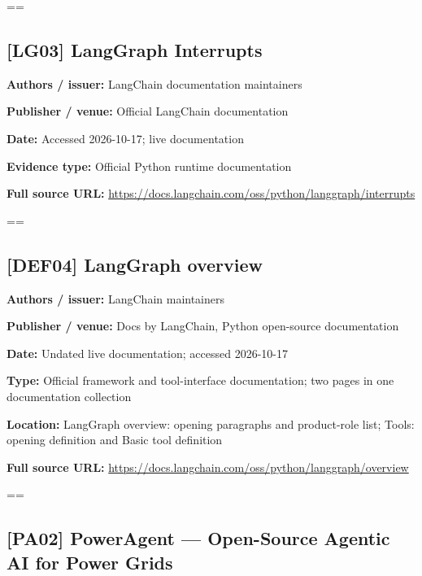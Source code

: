\documentclass[10pt,letterpaper]{article}
\begin{document}
\egroup\par\noindent\box\readingEntry\par\medskip
\setbox\readingEntry=\vbox\bgroup\hsize=\linewidth\subsection*{[LG03] LangGraph Interrupts}
\textbf{Authors / issuer:} LangChain documentation maintainers\par
\textbf{Publisher / venue:} Official LangChain documentation\par
\textbf{Date:} Accessed 2026-10-17; live documentation\par
\textbf{Evidence type:} Official Python runtime documentation\par
\textbf{Full source URL:} \href{https://docs.langchain.com/oss/python/langgraph/interrupts}{\small\ttfamily https:/\allowbreak{}/\allowbreak{}docs.\allowbreak{}langchain.\allowbreak{}com/\allowbreak{}oss/\allowbreak{}python/\allowbreak{}langgraph/\allowbreak{}interrupts}\par
\egroup\par\noindent\box\readingEntry\par\medskip
\setbox\readingEntry=\vbox\bgroup\hsize=\linewidth\subsection*{[DEF04] LangGraph overview}
\textbf{Authors / issuer:} LangChain maintainers\par
\textbf{Publisher / venue:} Docs by LangChain, Python open-source documentation\par
\textbf{Date:} Undated live documentation; accessed 2026-10-17\par
\textbf{Type:} Official framework and tool-interface documentation; two pages in one documentation collection\par
\textbf{Location:} LangGraph overview: opening paragraphs and product-role list; Tools: opening definition and Basic tool definition\par
\textbf{Full source URL:} \href{https://docs.langchain.com/oss/python/langgraph/overview}{\small\ttfamily https:/\allowbreak{}/\allowbreak{}docs.\allowbreak{}langchain.\allowbreak{}com/\allowbreak{}oss/\allowbreak{}python/\allowbreak{}langgraph/\allowbreak{}overview}\par
\egroup\par\noindent\box\readingEntry\par\medskip
\setbox\readingEntry=\vbox\bgroup\hsize=\linewidth\subsection*{[PA02] PowerAgent --- Open-Source Agentic AI for Power Grids}
\end{document}
